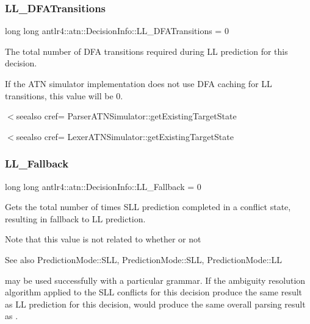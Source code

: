 \subsubsection{\texorpdfstring{L\+L\+\_\+\+D\+F\+A\+Transitions}{LL\_DFATransitions}}
{\footnotesize\ttfamily long long antlr4\+::atn\+::\+Decision\+Info\+::\+L\+L\+\_\+\+D\+F\+A\+Transitions = 0}



The total number of D\+FA transitions required during LL prediction for this decision. 

If the A\+TN simulator implementation does not use D\+FA caching for LL transitions, this value will be 0.

$<$seealso cref= Parser\+A\+T\+N\+Simulator\+::get\+Existing\+Target\+State 

$<$seealso cref= Lexer\+A\+T\+N\+Simulator\+::get\+Existing\+Target\+State \mbox{\label{classantlr4_1_1atn_1_1DecisionInfo_a311fb2f2a4f7c6108106b8700f03cb18}} 
\subsubsection{\texorpdfstring{L\+L\+\_\+\+Fallback}{LL\_Fallback}}
{\footnotesize\ttfamily long long antlr4\+::atn\+::\+Decision\+Info\+::\+L\+L\+\_\+\+Fallback = 0}



Gets the total number of times S\+LL prediction completed in a conflict state, resulting in fallback to LL prediction. 

Note that this value is not related to whether or not \begin{DoxySeeAlso}{See also}
Prediction\+Mode\+::\+S\+LL, Prediction\+Mode\+::\+S\+LL, Prediction\+Mode\+::\+LL


\end{DoxySeeAlso}
may be used successfully with a particular grammar. If the ambiguity resolution algorithm applied to the S\+LL conflicts for this decision produce the same result as LL prediction for this decision,  would produce the same overall parsing result as .\mbox{\label{classantlr4_1_1atn_1_1DecisionInfo_a38f6ee6c6bbed06adae2df60f11dd705}} 
